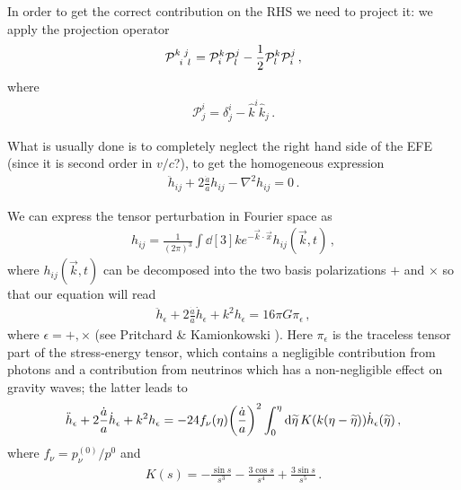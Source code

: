 \documentclass[main.tex]{subfiles}
\begin{document}
In order to get the correct contribution on the RHS we need to project it: we apply the projection operator 
%
\begin{align}
\tensor{\mathcal{P}}{^{k}_{i}^{j}_{l}} =
\mathcal{P}^{k}_{i} \mathcal{P}^{j}_{l}
- \frac{1}{2} \mathcal{P}^{k}_{l} \mathcal{P}^{j}_{i}
\,,
\end{align}
%
where 
%
\begin{align}
\mathcal{P}^{i}_{j} = \delta^{i}_{j} - \hat{k}^{i}\hat{k}_{j}
\,.
\end{align}


What is usually done is to completely neglect the right hand side of the EFE (since it is second order in \(v/c\)?), to get the homogeneous expression 
%
\begin{align}
\ddot{h}_{ij} + 2 \frac{\dot{a}}{a} h_{ij} - \nabla^2 h_{ij} = 0
\,.
\end{align}

We can express the tensor perturbation in Fourier space as 
%
\begin{align}
h_{ij} = \frac{1}{(2\pi )^3} \int \dd[3]{k} e^{- \vec{k} \cdot \vec{x}}
h_{ij} (\vec{k}, t)
\,,
\end{align}
%
where \(h_{ij} (\vec{k}, t)\) can be decomposed into the two basis polarizations \(+\) and \(\times \)
so that our equation will read 
%
\begin{align}
\ddot{h}_{\epsilon } + 2 \frac{\dot{a}}{a} \dot{h}_{\epsilon } + k^2 h_{\epsilon } = 16 \pi G \pi_{\epsilon }
\,,
\end{align}
%
where \(\epsilon = +, \times \) (see Pritchard \& Kamionkowski \cite[]{pritchardCosmicMicrowaveBackground2005}). 
Here \(\pi_{\epsilon } \) is the traceless tensor part of the stress-energy tensor, which contains a negligible contribution from photons and a contribution from neutrinos which has a non-negligible effect on gravity waves; the latter leads to 
%
\begin{align}
\ddot{h}_{\epsilon } + 2 \frac{\dot{a}}{a} \dot{h}_{\epsilon }
+ k^2 h_{\epsilon } =
-24 f_{\nu }(\eta ) \qty(\frac{\dot{a}}{a})^2
\int_{0}^{\eta } \dd{\widetilde{\eta} } K (k (\eta - \widetilde{\eta})) \dot{h}_{\epsilon }(\widetilde{\eta})
\,,
\end{align}
%
where \(f_{\nu } = p_{\nu }^{(0)} / p^{0}\) and 
%
\begin{align}
K(s) = - \frac{\sin s}{s^3} - \frac{3 \cos s}{s^{4}}
+ \frac{3 \sin s}{s^{5}}
\,.
\end{align}
\end{document}
